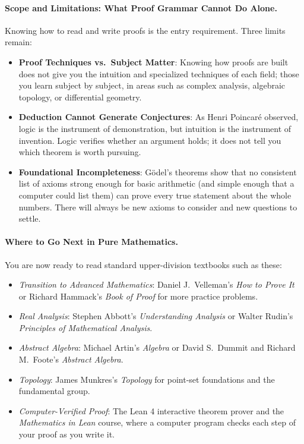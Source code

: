 \paragraph{Scope and Limitations: What Proof Grammar Cannot Do Alone.}
Knowing how to read and write proofs is the entry requirement. Three limits remain:
\begin{itemize}
  \item \textbf{Proof Techniques vs.\ Subject Matter}: Knowing how proofs are built does not give you the intuition and specialized techniques of each field; those you learn subject by subject, in areas such as complex analysis, algebraic topology, or differential geometry.
  \item \textbf{Deduction Cannot Generate Conjectures}: As Henri Poincar\'e observed, logic is the instrument of demonstration, but intuition is the instrument of invention. Logic verifies whether an argument holds; it does not tell you which theorem is worth pursuing.
  \item \textbf{Foundational Incompleteness}: G\"odel's theorems show that no consistent list of axioms strong enough for basic arithmetic (and simple enough that a computer could list them) can prove every true statement about the whole numbers. There will always be new axioms to consider and new questions to settle.
\end{itemize}

\paragraph{Where to Go Next in Pure Mathematics.}
You are now ready to read standard upper-division textbooks such as these:
\begin{itemize}
  \item \emph{Transition to Advanced Mathematics}: Daniel J.~Velleman's \emph{How to Prove It} or Richard Hammack's \emph{Book of Proof} for more practice problems.
  \item \emph{Real Analysis}: Stephen Abbott's \emph{Understanding Analysis} or Walter Rudin's \emph{Principles of Mathematical Analysis}.
  \item \emph{Abstract Algebra}: Michael Artin's \emph{Algebra} or David S.~Dummit and Richard M.~Foote's \emph{Abstract Algebra}.
  \item \emph{Topology}: James Munkres's \emph{Topology} for point-set foundations and the fundamental group.
  \item \emph{Computer-Verified Proof}: The Lean 4 interactive theorem prover and the \emph{Mathematics in Lean} course, where a computer program checks each step of your proof as you write it.
\end{itemize}

